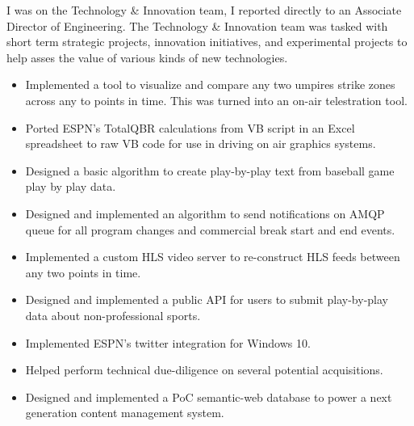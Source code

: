 \documentclass{article}
\begin{document}
\vspace{3pt} I was on the Technology \& Innovation team, I reported directly to an Associate Director of Engineering. The Technology \& Innovation team was tasked with short term strategic projects,
innovation initiatives, and experimental projects to help asses the value of various kinds of new technologies. 
\begin{multicols}{2}
  \begin{small}
    \begin{itemize}[leftmargin=*,label=\tiny{$\bullet$}]
    \item\begin{minipage}[t]{\linewidth}{Implemented a tool to visualize and compare any two umpires strike zones across any to points in time. This was turned into an on-air telestration tool.}\end{minipage}
    \item\begin{minipage}[t]{\linewidth}{Ported ESPN's TotalQBR calculations from VB script in an Excel spreadsheet to raw VB code for use in driving on air graphics systems.}\end{minipage}
    \item\begin{minipage}[t]{\linewidth}{Designed a basic algorithm to create play-by-play text from baseball game play by play data.}\end{minipage}
    \item\begin{minipage}[t]{\linewidth}{Designed and implemented an algorithm to send notifications on AMQP queue for all program changes and commercial break start and end events.}\end{minipage}
    \item\begin{minipage}[t]{\linewidth}{Implemented a custom HLS video server to re-construct HLS feeds between any two points in time.}\end{minipage}
    \item\begin{minipage}[t]{\linewidth}{Designed and implemented a public API for users to submit play-by-play data about non-professional sports.}\end{minipage}
    \item\begin{minipage}[t]{\linewidth}{Implemented ESPN's twitter integration for Windows 10.}\end{minipage}
    \item\begin{minipage}[t]{\linewidth}{Helped perform technical due-diligence on several potential acquisitions.}\end{minipage}
    \item\begin{minipage}[t]{\linewidth}{Designed and implemented a PoC semantic-web database to power a next generation content management system.}\end{minipage}
    \end{itemize}
  \end{small} 
\end{multicols}
\end{document}
